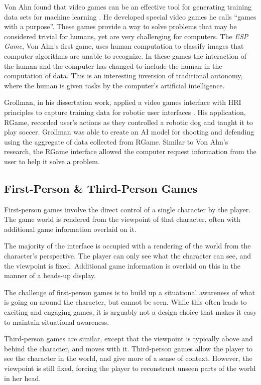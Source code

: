 Von Ahn found that video games can be an effective tool for generating training data sets for machine learning \cite{GWAP}. He developed special video games he calls ``games with a purpose''.  These games provide a way to solve problems that may be considered trivial for humans, yet are very challenging for computers. The \emph{ESP Game}, Von Ahn's first game, uses human computation to classify images that computer algorithms are unable to recognize. In these games the interaction of the human and the computer has changed to include the human in the computation of data. This is an interesting inversion of traditional autonomy, where the human is given tasks by the computer's artificial intelligence\cite{GWAP}.

Grollman, in his dissertation work, applied a video games interface with HRI principles to capture training data for robotic user interfaces \cite{Grollman}. His application, RGame, recorded user’s actions as they controlled a robotic dog and taught it to play soccer. Grollman was able to create an AI model for shooting and defending using the aggregate of data collected from RGame. Similar to Von Ahn's research, the RGame interface allowed the computer request information from the user to help it solve a problem.

\subsection{First-Person \& Third-Person Games} %
\label{sub:first_person_games}
First-person games involve the direct control of a single character by the player. The game world is rendered from the viewpoint of that character, often with additional game information overlaid on it. 

The majority of the interface is occupied with a rendering of the world from the character’s perspective. The player can only see what the character can see, and the viewpoint is fixed. Additional game information is overlaid on this in the manner of a heads-up display.

The challenge of first-person games is to build up a situational awareness of what is going on around the character, but cannot be seen. While this often leads to exciting and engaging games, it is arguably not a design choice that makes it easy to maintain situational awareness.

Third-person games are similar, except that the viewpoint is typically above and behind the character, and moves with it. Third-person games allow the player to see the character in the world, and give more of a sense of context. However, the viewpoint is still fixed, forcing the player to reconstruct unseen parts of the world in her head.


